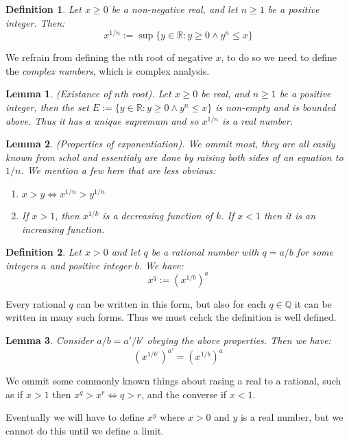 \documentclass{article}
\newtheorem{definition}{Definition}[subsection]
\newtheorem{lemma}{Lemma}[subsection]
\newcommand{\R}{\mathbb{R}}
\newcommand{\Q}{\mathbb{Q}}
\let\it\textit
\begin{document}
\begin{definition}
	Let $x \geq 0$ be a non-negative real,
	and let $n \geq 1$ be a positive 
	integer. Then:
	$$
	x^{1/n} := \sup \{ y \in\R : y \geq 0 \land y^n \leq x \}
	$$
\end{definition}

We refrain from defining the $n$th root of negative $x$, to 
do so we need to define the \it{complex numbers}, which 
is complex analysis.

\begin{lemma}
	(Existance of $n$th root). Let $x \geq 0$ be real, 
	and $n \geq 1$ be a positive integer, then 
	the set $E:= \{ y \in \R: y \geq 0 \land y^n \leq x\}$
	is non-empty and is bounded above. Thus 
	it has a unique supremum and so $x^{1/n}$ is 
	a real number.
\end{lemma}

\begin{lemma}
	(Properties of exponentiation). We ommit most, 
	they are all easily known from schol and
	essentialy are done by raising both sides of an 
	equation to $1/n$. We mention a few here that 
	are less obvious:
	\begin{enumerate}[label=(\alph*)]
		\item $x > y \iff x^{1/n} > y ^{1/n}$
		\item If $x>1$, then $x^{1/k}$ is 
			a decreasing function of $k$. If 
			$x < 1$ then it is an increasing 
			function. 
	\end{enumerate}
\end{lemma}

\begin{definition}
	Let $x>0$ and let $q$ be a rational number
	with $q = a/b$ for some integers $a$ and 
	positive integer $b$. We have:
	$$
	x^q := (x^{1/b})^a
	$$
\end{definition}

Every rational $q$ can be written in this form, 
but also for each $q \in \Q$ it can be written 
in many such forms. Thus we must cehck 
the definition is well defined.

\begin{lemma}
	Consider $a/b = a'/b'$ obeying the above
	properties. Then we have:
	$$
	(x^{1/b'})^{a'} = (x^{1/b})^a
	$$
\end{lemma}

We ommit some commonly known things about 
rasing a real to a rational, such as 
if $x>1$ then $x^q > x^r \iff q > r$, and 
the converse if $x <1$. 

Eventually we will have to define 
$x^y$ where $x>0$ and $y$ is 
a real number, but we cannot 
do this until we define a limit.
\end{document}

